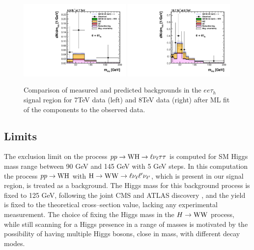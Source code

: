 \begin{figure}
\begin{center}
  \includegraphics[width=0.49\textwidth]{4_Analisys/pics/postfit/eet_postfit_7TeV_FitAllChannels.pdf}
  \includegraphics[width=0.49\textwidth]{4_Analisys/pics/postfit/eet_postfit_8TeV_FitAllChannels.pdf}\\
  \caption{Comparison of measured and predicted backgrounds in the $ee\tau_h$ signal region for 7TeV data (left) and 8TeV data (right) after ML fit of the components to the observed data.}
  \label{fig:LLT_eet_postfit}
\end{center}
\end{figure}

\subsection{Limits}

The exclusion limit on the process $pp\rightarrow\mathrm{W}\mathrm{H}\rightarrow\ell\nu_\ell\tau\tau$ is computed for SM Higgs mass range between 90 GeV and 145 GeV with 5 GeV steps. In this computation the process $pp\rightarrow\mathrm{W}\mathrm{H}$ with $\mathrm{H}\rightarrow\mathrm{W}\mathrm{W}\rightarrow\ell\nu_{\ell}\ell'\nu_{\ell'}$, which is present in our signal region, is treated as a background. The Higgs mass for this background process is fixed to 125 GeV, following the joint CMS and ATLAS discovery \cite{Chatrchyan:2013lba,Aad:2012tfa}, and the yield is fixed to the theoretical cross--section value, lacking any experimental measurement. The choice of fixing the Higgs mass in the $H\rightarrow\mathrm{W}\mathrm{W}$ process, while still scanning for a Higgs presence in a range of masses is motivated by the possibility of having multiple Higgs bosons, close in mass, with different decay modes.

